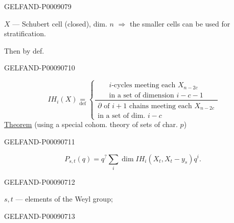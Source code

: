 \begin{GelfandAdjacentEvidence}{GELFAND-P000907}{9}


\(X\) --- Schubert cell (closed), dim. \(n\) \(\Rightarrow\) the smaller cells can be used for stratification.

Then by def.

\end{GelfandAdjacentEvidence}
\begin{GelfandAdjacentEvidence}{GELFAND-P000907}{10}


\begin{equation*}
IH_i(X)\underset{\mathrm{def}}{=}
\left\{\frac{\begin{gathered}
i\text{-cycles meeting each }X_{n-2c}\\
\text{in a set of dimension }i-c-1
\end{gathered}}{\begin{gathered}
\partial\text{ of \(i+1\) chains meeting each }X_{n-2c}\\
\text{in a set of dim. }i-c
\end{gathered}}\right.
\tag{4}
\end{equation*}
\uline{Theorem} (using a special cohom. theory of sets of char. \(p\))
\end{GelfandAdjacentEvidence}
\begin{GelfandAdjacentEvidence}{GELFAND-P000907}{11}


\begin{equation*}
P_{s,t}(q)=q^{?}\sum_i\dim IH_i(X_t,X_t-y_s)q^i.
\tag{5}
\end{equation*}
\end{GelfandAdjacentEvidence}
\begin{GelfandAdjacentEvidence}{GELFAND-P000907}{12}


$s,t$ --- elements of the Weyl group;
\end{GelfandAdjacentEvidence}
\begin{GelfandAdjacentEvidence}{GELFAND-P000907}{13}


\end{GelfandAdjacentEvidence}



